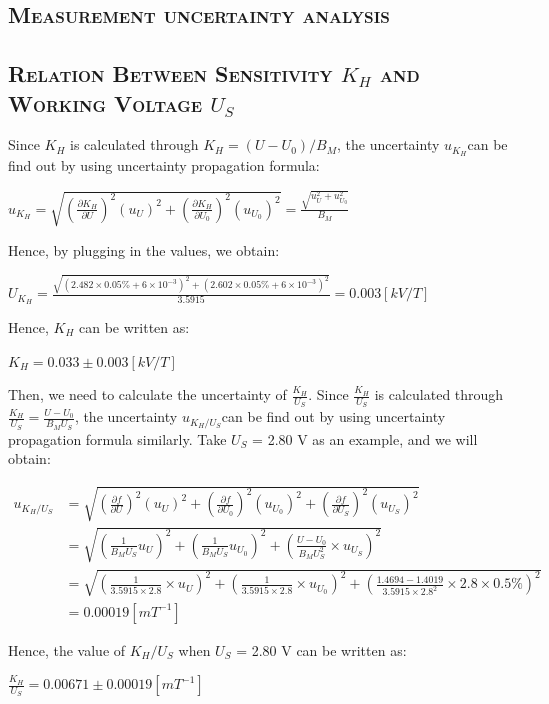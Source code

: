 \documentclass[a4paper,12pt]{article}
\begin{document}
\begin{appendices} 
\section{\textsc{Measurement uncertainty analysis}} 
\subsection{\textsc{Relation Between Sensitivity $K_H$ and Working Voltage $U_S$}} 
Since $K_H$ is calculated through $ K_H = (U-U_0)/B_M $, the uncertainty $u_{K_H}$can be find out by using uncertainty propagation formula:
\begin{center}
$\displaystyle u_{K_H} = \sqrt{(\frac{\partial K_H}{\partial U})^2(u_U)^2 + (\frac{\partial K_H}{\partial U_0})^2(u_{U_0})^2} = \frac{\sqrt{u_U^2 + u_{U_0}^2}}{B_M}$ 
\end{center}
Hence, by plugging in the values, we obtain:
\begin{center}
$\displaystyle U_{K_H} = \frac{ \sqrt{(2.482 \times 0.05\% + 6\times 10^{-3})^2 + (2.602 \times 0.05\% + 6\times 10^{-3})^2} }{3.5915} = 0.003 [kV/T] $
\end{center}
\par Hence, $K_H$ can be written as:
\begin{center}
$ K_H = 0.033 \pm 0.003 [kV/T] $
\end{center}

\par Then, we need to calculate the uncertainty of $\frac{K_H}{U_S}$. Since $\frac{K_H}{U_S}$ is calculated through $\frac{K_H}{U_S} = \frac{U-U_0}{B_M U_S}$, the uncertainty $u_{K_H/U_S}$can be find out by using uncertainty propagation formula similarly. Take $U_S$ = 2.80 V as an example, and we will obtain:
\begin{center}
$\begin{aligned} 
u_{K_H/U_S} &=\sqrt{(\frac{\partial f}{\partial U})^2(u_U)^2 + (\frac{\partial f}{\partial U_0})^2(u_{U_0})^2 + (\frac{\partial f}{\partial U_S})^2(u_{U_S})^2} \\ 
				&=\sqrt{\left(\frac{1}{B_M U_{S}} u_{U}\right)^{2}+\left(\frac{1}{B_M U_{S}} u_{U_{0}}\right)^{2}+\left(\frac{U-U_{0}}{B_M U_{S}^{2}} \times u_{U_{S}}\right)^{2}} \\ 
				&=\sqrt{\left(\frac{1}{3.5915 \times 2.8} \times u_{U}\right)^{2}+\left(\frac{1}{3.5915 \times 2.8} \times u_{U_{0}}\right)^{2}+\left(\frac{1.4694-1.4019}{3.5915 \times 2.8^{2}} \times 2.8 \times 0.5 \%\right)^{2}} \\ 
				&=0.00019 [mT^{-1}] 
\end{aligned} $
\end{center}
Hence, the value of $K_H/U_S$ when $U_S$ = 2.80 V can be written as:
\begin{center}
$\displaystyle \frac{K_H}{U_S} = 0.00671 \pm 0.00019 [mT^{-1}] $ 
\end{center}


\end{appendices}
\end{document}
